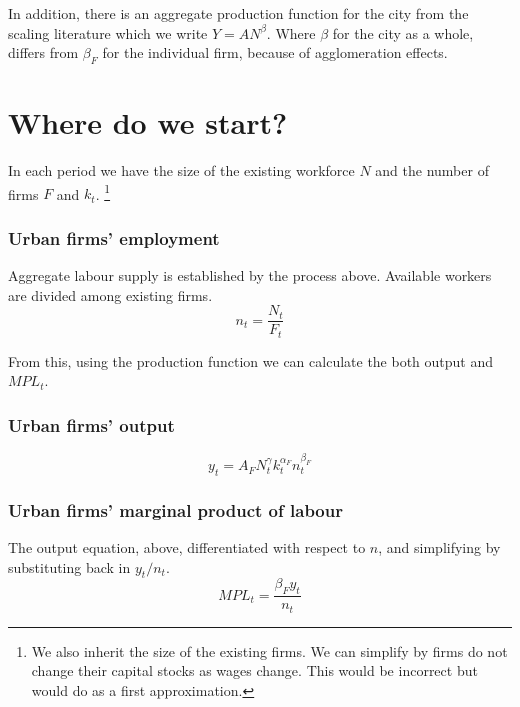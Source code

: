 In addition, there is an aggregate production function for the city from the scaling literature which we write $Y=AN^\beta$. Where $\beta$ for the city as a whole, differs from $\beta_F$ for the individual firm, because of agglomeration effects. %


\section{Where do we start?}
In each period we have the size of the existing workforce $N$ and the number of firms $F$ and $k_t$. \footnote{We also inherit the size of the existing firms. We can simplify by firms do not change their capital stocks as wages change. This would be incorrect but would do as a first approximation.}

\subsubsection{Urban firms' employment} 
Aggregate labour supply is established by the process  above.  Available workers are divided among existing firms.   \begin{equation}
    n_t= \frac{N_t}{F_t} 
\end{equation}

From this, using the production function we can calculate the both output and  $MPL_t$.

\subsubsection{Urban firms' output}
\begin{equation}
    {y}_t=A_FN_t^\gamma k_t^{\alpha_F}n_t^{\beta_F} \label{eqn-urban-firm-output}
\end{equation}

\subsubsection{Urban firms'  marginal product of labour}

The output equation, above, differentiated with respect to  $n$, and simplifying by substituting back in $y_t/n_t$. %
\begin{equation}MPL_{t} = \frac{\beta_{F}{y}_{t}} {n_t} \label{eqn-urban-firm-mpl}
\end{equation} 

